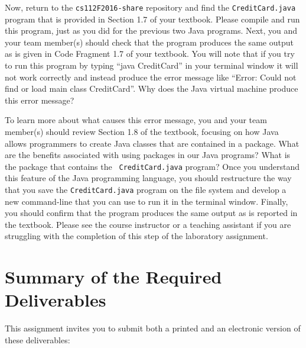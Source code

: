 Now, return to the {\tt cs112F2016-share} repository and find the {\tt CreditCard.java} program that is provided in
Section 1.7 of your textbook. Please compile and run this program, just as you did for the previous two Java programs.
Next, you and your team member(s) should check that the program produces the same output as is given in Code Fragment
1.7 of your textbook. You will note that if you try to run this program by typing ``java CreditCard'' in your terminal
window it will not work correctly and instead produce the error message like ``Error: Could not find or load main class
CreditCard''. Why does the Java virtual machine produce this error message?

To learn more about what causes this error message, you and your team member(s) should review Section 1.8 of the
textbook, focusing on how Java allows programmers to create Java classes that are contained in a package. What are the
benefits associated with using packages in our Java programs? What is the package that contains the {\tt
CreditCard.java} program? Once you understand this feature of the Java programming language, you should restructure the
way that you save the {\tt CreditCard.java} program on the file system and develop a new command-line that you can use
to run it in the terminal window. Finally, you should confirm that the program produces the same output as is reported
in the textbook. Please see the course instructor or a teaching assistant if you are struggling with the completion of
this step of the laboratory assignment.

\section*{Summary of the Required Deliverables}

This assignment invites you to submit both a printed and an electronic version of these deliverables:

